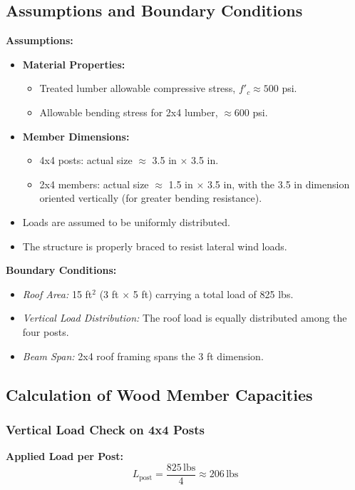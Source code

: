 \documentclass[12pt]{report}
\begin{document}
\subsection{Assumptions and Boundary Conditions}
\textbf{Assumptions:}
\begin{itemize}
    \item \textbf{Material Properties:}
    \begin{itemize}
        \item Treated lumber allowable compressive stress, \(f'_c \approx 500\) psi.
        \item Allowable bending stress for 2x4 lumber, \(\approx 600\) psi.
    \end{itemize}
    \item \textbf{Member Dimensions:}
    \begin{itemize}
        \item 4x4 posts: actual size $\approx$ 3.5 in $\times$ 3.5 in.
        \item 2x4 members: actual size $\approx$ 1.5 in $\times$ 3.5 in, with the 3.5 in dimension oriented vertically (for greater bending resistance).
    \end{itemize}
    \item Loads are assumed to be uniformly distributed.
    \item The structure is properly braced to resist lateral wind loads.
\end{itemize}

\textbf{Boundary Conditions:}
\begin{itemize}
    \item \emph{Roof Area:} 15 ft\(^2\) (3 ft $\times$ 5 ft) carrying a total load of 825 lbs.
    \item \emph{Vertical Load Distribution:} The roof load is equally distributed among the four posts.
    \item \emph{Beam Span:} 2x4 roof framing spans the 3 ft dimension.
\end{itemize}

\subsection{Calculation of Wood Member Capacities}

\subsubsection{Vertical Load Check on 4x4 Posts}
\textbf{Applied Load per Post:}
\[
L_{\text{post}} = \frac{825\,\text{lbs}}{4} \approx 206\,\text{lbs}
\]
\end{document}
